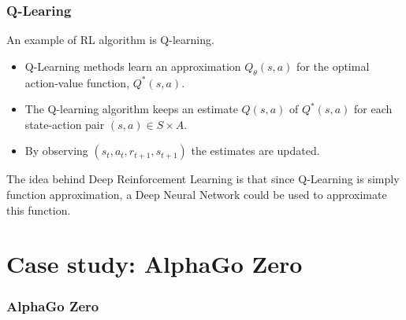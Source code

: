 \documentclass[9pt]{beamer}
\begin{document}
\begin{frame}
	\frametitle{Q-Learing}
	An example of RL algorithm is Q-learning.\\
	\begin{itemize}
		\item Q-Learning methods learn an approximation $Q_{\theta}(s,a)$ for the optimal action-value function, $Q^*(s,a)$.
		\item The Q-learning algorithm keeps an estimate $Q(s,a)$ of $Q^*(s,a)$ for each state-action pair $(s,a) \in S \times A$.
		\item By observing $(s_t, a_t, r_{t+1}, s_{t+1})$ the estimates are updated.
	\end{itemize}
	
	The idea behind Deep Reinforcement Learning is that since Q-Learning is simply function approximation, a Deep Neural Network could be used to approximate this function. 

\end{frame}


\section{Case study: AlphaGo Zero}

\begin{frame}
	\frametitle{AlphaGo Zero}
	
	\tableofcontents[ 
	currentsubsection, 
	hideothersubsections, 
	sectionstyle=show/shaded,
	]
	
\end{frame}
\end{document}
